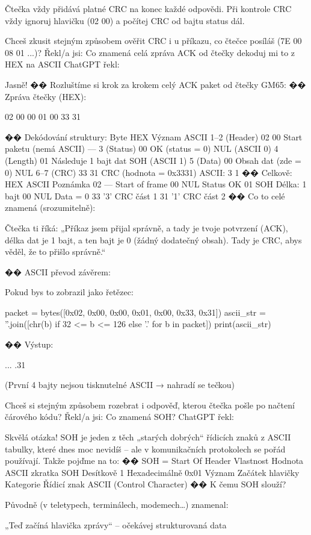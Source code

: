     Čtečka vždy přidává platné CRC na konec každé odpovědi.
    Při kontrole CRC vždy ignoruj hlavičku (02 00) a počítej CRC od bajtu status dál.

Chceš zkusit stejným způsobem ověřit CRC i u příkazu, co čtečce posíláš (7E 00 08 01 ...)?
Řekl/a jsi:
Co znamená celá zpráva ACK od čtečky dekoduj mi to z HEX na ASCII
ChatGPT řekl:

Jasně! �� Rozluštíme si krok za krokem celý ACK paket od čtečky GM65:
�� Zpráva čtečky (HEX):

02 00 00 01 00 33 31

�� Dekódování struktury:
Byte	HEX	Význam	ASCII
1–2 (Header)	02 00	Start paketu (nemá ASCII)	—
3 (Status)	00	OK (status = 0)	NUL (ASCII 0)
4 (Length)	01	Následuje 1 bajt dat	SOH (ASCII 1)
5 (Data)	00	Obsah dat (zde = 0)	NUL
6–7 (CRC)	33 31	CRC (hodnota = 0x3331)	ASCII: 3 1
�� Celkově:
HEX	ASCII	Poznámka
02	—	Start of frame
00	NUL	Status OK
01	SOH	Délka: 1 bajt
00	NUL	Data = 0
33	'3'	CRC část 1
31	'1'	CRC část 2
�� Co to celé znamená (srozumitelně):

    Čtečka ti říká: „Příkaz jsem přijal správně, a tady je tvoje potvrzení (ACK), délka dat je 1 bajt, a ten bajt je 0 (žádný dodatečný obsah). Tady je CRC, abys věděl, že to přišlo správně.“

�� ASCII převod závěrem:

Pokud bys to zobrazil jako řetězec:

packet = bytes([0x02, 0x00, 0x00, 0x01, 0x00, 0x33, 0x31])
ascii_str = ''.join([chr(b) if 32 <= b <= 126 else '.' for b in packet])
print(ascii_str)

��️ Výstup:

... .31

(První 4 bajty nejsou tisknutelné ASCII → nahradí se tečkou)

Chceš si stejným způsobem rozebrat i odpověď, kterou čtečka pošle po načtení čárového kódu?
Řekl/a jsi:
Co znamená SOH?
ChatGPT řekl:

Skvělá otázka! SOH je jeden z těch „starých dobrých“ řídicích znaků z ASCII tabulky, které dnes moc nevidíš – ale v komunikačních protokolech se pořád používají. Takže pojďme na to:
�� SOH = Start Of Header
Vlastnost	Hodnota
ASCII zkratka	SOH
Desítkově	1
Hexadecimálně	0x01
Význam	Začátek hlavičky
Kategorie	Řídicí znak ASCII (Control Character)
�� K čemu SOH slouží?

Původně (v teletypech, terminálech, modemech…) znamenal:

    „Teď začíná hlavička zprávy“ – očekávej strukturovaná data

